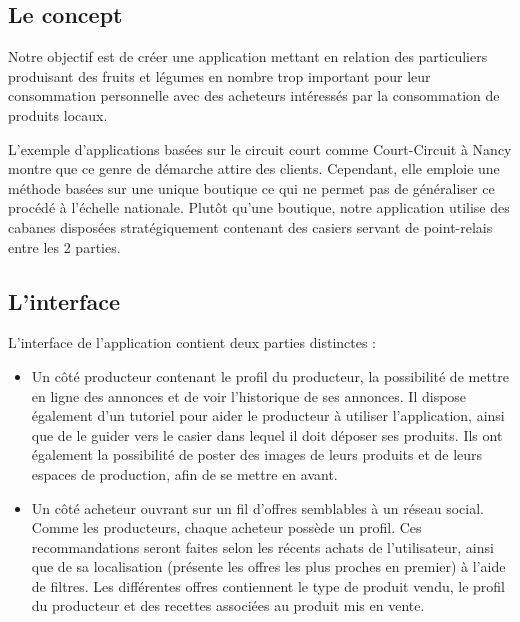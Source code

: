 \documentclass[11pt]{article}
\begin{document}
\subsection{Le concept}

Notre objectif est de créer une application mettant en relation des particuliers produisant des fruits et légumes en nombre trop important pour leur consommation personnelle avec des acheteurs intéressés par la consommation de produits locaux.

\vspace{0.2cm}

L’exemple d’applications basées sur le circuit court comme Court-Circuit à Nancy montre que ce genre de démarche attire des clients. Cependant, elle emploie une méthode basées sur une unique boutique ce qui ne permet pas de généraliser ce procédé à l’échelle nationale. Plutôt qu’une boutique, notre application utilise des \og cabanes \fg disposées stratégiquement contenant des casiers servant de point-relais entre les 2 parties. 

\subsection{L'interface}

L’interface de l’application contient deux parties distinctes :

\begin{itemize}

\vspace{0.2cm}

	\item Un côté producteur contenant le profil du producteur, la possibilité de mettre en ligne des annonces et de voir l’historique de ses annonces. Il dispose également d’un tutoriel pour aider le producteur à utiliser l’application, ainsi que de le guider vers le casier dans lequel il doit déposer ses produits. Ils ont également la possibilité de poster des images de leurs produits et de leurs espaces de production, afin de se mettre en avant. 

	\item Un côté acheteur ouvrant sur un fil d’offres semblables à un réseau social. Comme les producteurs, chaque acheteur possède un profil. Ces recommandations seront faites selon les récents achats de l’utilisateur, ainsi que de sa localisation (présente les offres les plus proches en premier) à l’aide de filtres. Les différentes offres contiennent le type de produit vendu, le profil du producteur et des recettes associées au produit mis en vente.
	
\end{itemize}
\end{document}
